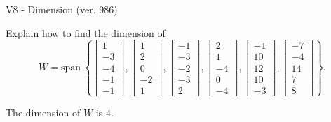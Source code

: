 \begin{exercise}
  \begin{exerciseTitle}V8 - Dimension (ver. 986)\end{exerciseTitle}
  \begin{exerciseStatement}
    Explain how to find the dimension of 
\[W=\mathrm{span}\ \left\{\left[\begin{array}{r}
1 \\
-3 \\
-4 \\
-1 \\
-1
\end{array}\right] , \left[\begin{array}{r}
1 \\
2 \\
0 \\
-2 \\
1
\end{array}\right] , \left[\begin{array}{r}
-1 \\
-3 \\
-2 \\
-3 \\
2
\end{array}\right] , \left[\begin{array}{r}
2 \\
1 \\
-4 \\
0 \\
-4
\end{array}\right] , \left[\begin{array}{r}
-1 \\
10 \\
12 \\
10 \\
-3
\end{array}\right] , \left[\begin{array}{r}
-7 \\
-4 \\
14 \\
7 \\
8
\end{array}\right]\right\}.\]



  \end{exerciseStatement}
  \begin{exerciseAnswer}
   The dimension of \(W\) is  \(4\).
  


  \end{exerciseAnswer}
\end{exercise}